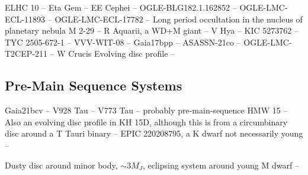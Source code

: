 \documentclass[%
 reprint,
 amsmath,amssymb,
 aps,
rmp,
floatfix,
]{revtex4-2}
\def\\{}%
\begin{document}
ELHC 10 -- \citep{Garrido2016MNRAS} \\
Eta Gem -- \citep{Torres2022MNRAS} \\
EE Cephei -- \citep{Mikolajewski1999MNRAS, Pienkowski2020A&A} \\
OGLE-BLG182.1.162852 -- \citep{Rattenbury2015MNRAS} \\
OGLE-LMC-ECL-11893 -- \citep{Dong2014ApJ, Scott2014ApJ} \\
OGLE-LMC-ECL-17782 -- \citep{Graczyk2011AcA} \\
Long period occultation in the nucleus of planetary nebula M 2-29 -- \citep{Hajduk2008A&A} \\
R Aquarii, a WD+M giant -- \citep{Hinkle2022ApJ} \\
V Hya -- \citep{Knapp1999A&A} \\
KIC 5273762 -- \citep{Jayasinghe2018RNAAS} \\
TYC 2505-672-1 -- \citep{Rodriguez2016AJ, Lipunov2016A&A} \\
VVV-WIT-08 -- \citep{Smith2021MNRAS} \\
Gaia17bpp -- \citep{Tzanidakis2023ApJ} \\
ASASSN-21co -- \citep{Rowan2021RNAAS} \\
OGLE-LMC-T2CEP-211 -- \citep{Pilecki2018ApJ} \\
W Crucis \citep{Pavlovski2006A&A} \\
Evolving disc profile -- \citep{Bernhard2024arXiv} \\


\subsection{Pre-Main Sequence Systems} \label{sec:preMS-disc}
Gaia21bcv -- \citep{Hodapp2024AJ} \\
V928 Tau -- \citep{van-Dam2020AJ} \\
V773 Tau -- probably pre-main-sequence \citep{Kenworthy2022A&A} \\
HMW 15 -- \citep{Cohen2003ApJ} \\
Also an evolving disc profile in KH 15D, although this is from a circumbinary disc around a T Tauri binary
 -- \citep{Hamilton2001ApJ, Hamilton2005AJ, Winn2006ApJ} \\
EPIC 220208795, a K dwarf not necessarily young -- \citep{van-der-Kamp2022A&A}

Dusty disc around minor body, $\sim 3M_J$, eclipsing system around young M dwarf -- \citep{Rappaport2019MNRAS}
\end{document}
